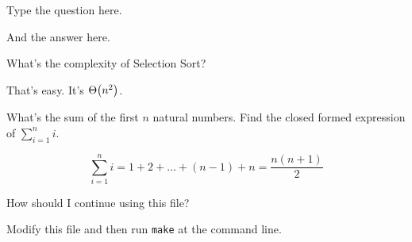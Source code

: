 \documentclass[11pt, twocolumn]{article}
\begin{document}
\begin{question}
  Type the question here.
\end{question}
\begin{answer}
  And the answer here.
\end{answer}

\begin{question}
  What's the complexity of Selection Sort?
\end{question}
\begin{answer}
  That's easy. It's $\Theta\!\left(n^2\right)$.
\end{answer}

\begin{question}
  What's the sum of the first $n$ natural numbers. Find the closed formed
  expression of $\sum^{n}_{i=1}i$.
\end{question}
\begin{answer}
  \[
    \sum^{n}_{i=1}i = 1 + 2 + \ldots + (n-1) + n = \frac{n(n+1)}{2}
  \]
\end{answer}

\begin{question}
  How should I continue using this file?
\end{question}
\begin{answer}
  Modify this file and then run \texttt{make} at the command line.
\end{answer}
\end{document}

